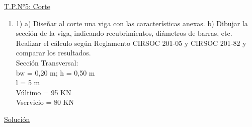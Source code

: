 \begin{center}
\underline{\Large{T.P.N°5: Corte}}
\end{center}

\begin{enumerate}
\item 1) a) Diseñar al corte una viga con las características anexas. b) Dibujar la sección de la viga, indicando recubrimientos, diámetros de barras, etc. Realizar el cálculo según Reglamento CIRSOC 201-05 y CIRSOC 201-82 y comparar los resultados.\\
Sección Transversal:\\
bw = 0,20 m; h = 0,50 m\\
l = 5 m\\
Vúltimo = 95 KN\\
Vservicio = 80 KN\\
\end{enumerate}

\begin{center}
\underline{\Large{Solución}}
\end{center}

